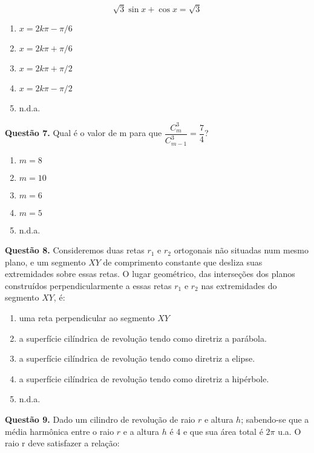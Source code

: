 \documentclass[11pt]{article}
\begin{document}
$$
\sqrt{3} \sin x + \cos x = \sqrt{3}
$$

\begin{multicols}{3}
    \begin{enumerate}[\bf A (\quad)]
        \item $x = 2k\pi - \pi/6$
        \item $x = 2k\pi + \pi/6$
        \item $x = 2k\pi + \pi/2$
        \item $x = 2k\pi - \pi/2$
        \item n.d.a.
    \end{enumerate}
\end{multicols}

\textbf{Questão 7.} Qual é o valor de m para que $\dfrac{C_m^3}{C_{m-1}^3} = \dfrac{7}{4}$? 



\begin{enumerate}[\bf A (\quad)]
    \item $m = 8$
    \item $m = 10$
    \item $m = 6$
    \item $m = 5$
    \item n.d.a.
\end{enumerate}

\textbf{Questão 8.} Consideremos   duas   retas   $r_1$   e   $r_2$   ortogonais   não   situadas   num   mesmo   plano,   e   um   segmento   $XY$   de   comprimento  constante  que  desliza  suas  extremidades  sobre essas retas. O lugar geométrico, das interseções dos planos construídos perpendicularmente a essas retas $r_1$ e $r_2$ nas extremidades do segmento $XY$, é:

\begin{enumerate}[\bf A (\quad)]
    \item uma reta perpendicular ao segmento $XY$
    \item a superfície cilíndrica de revolução tendo como diretriz a parábola.
    \item a superfície cilíndrica de revolução tendo como diretriz a elipse.
    \item a superfície cilíndrica de revolução tendo como diretriz a hipérbole.
    \item n.d.a.
\end{enumerate}

\textbf{Questão 9.} Dado  um  cilindro  de  revolução  de  raio  $r$  e  altura  $h$;  sabendo-se que a média harmônica entre o raio $r$ e a altura $h$ é 4 e que sua área total é $2\pi$ u.a. O raio r deve satisfazer a relação: 
\end{document}
